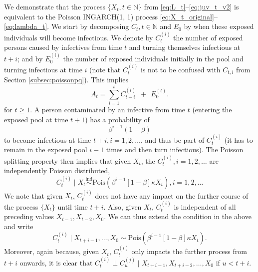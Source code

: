 \documentclass{article}
\begin{document}
We demonstrate that the process $\{X_t, t \in \mathbb{N}\}$ from \eqref{eq:L_t}--\eqref{eq:juv_t_v2} is equivalent to the Poisson INGARCH(1, 1) process \eqref{eq:X_t_original}--\eqref{eq:lambda_t}. We start by decomposing $C_t, t \in \mathbb{N}$ and $E_0$ by when these exposed individuals will become infectious. We denote by $C_t^{(i)}$ the number of exposed persons caused by infectives from time $t$ and turning themselves infectious at $t + i$; and by $E^{(i)}_0$ the number of exposed individuals initially in the pool and turning infectious at time $i$ (note that $C_t^{(i)}$ is not to be confused with $C_{t, i}$ from Section \ref{subsec:poissonpq}). This implies
\begin{equation}
A_t = \sum_{i = 1}^{t} C_{t - i}^{(i)} \ \ + \ \ E_0^{(t)}.
\label{eq:sums}
\end{equation}
for $ t \geq 1$. A person contaminated by an infective from time $t$ (entering the exposed pool at time $t + 1$) has a probability of 
\begin{equation}
\beta^{i - 1}(1 - \beta)\label{eq:geom_distr}
\end{equation}
to become infectious at time $t + i, i = 1, 2, \dots$, and thus be part of $C_t^{(i)}$ (it has to remain in the exposed pool $i - 1$ times and then turn infectious). The Poisson splitting property \cite{Kingman1993} then implies that given $X_t$, the $C_t^{(i)}, i =1, 2, \dots$ are independently Poisson distributed,
$$
C_t^{(i)} \mid X_t \stackrel{\text{ind}}{\sim} \text{Pois}(\beta^{i - 1}[1 - \beta]\kappa X_t), i =1, 2, \dots %
$$
We note that given $X_t$, $C_t^{(i)}$ does not have any impact on the further course of the process $\{X_t\}$ until time $t + i$. Also, given $X_t$, $C_t^{(i)}$ is independent of all preceding values $X_{t - 1}, X_{t - 2}, X_0$. We can thus extend the condition in the above and write
\begin{equation}
C_t^{(i)} \mid X_{t + i - 1}, \dots, X_0 \sim \text{Pois}(\beta^{i - 1}[1 - \beta]\kappa X_t). \label{eq:conditional_Cti} %
\end{equation}
Moreover, again because, given $X_t$, $C_t^{(i)}$ only impacts the further process from $t + i$ onwards, it is clear that $C_t^{(i)} \perp C_u^{(j)} \mid X_{t + i - 1}, X_{t + i - 2}, \dots, X_0$ if $u < t + i$.
\end{document}
